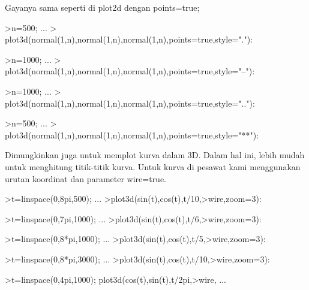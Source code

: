 \documentclass{article}
\begin{document}
\begin{eulernotebook}
\begin{eulercomment}
Gayanya sama seperti di plot2d dengan points=true;
\end{eulercomment}
\begin{eulerprompt}
>n=500;  ...
>  plot3d(normal(1,n),normal(1,n),normal(1,n),points=true,style="."):
\end{eulerprompt}
\begin{eulerprompt}
>n=1000;  ...
>  plot3d(normal(1,n),normal(1,n),normal(1,n),points=true,style="--"):
\end{eulerprompt}
\begin{eulerprompt}
>n=1000;  ...
>  plot3d(normal(1,n),normal(1,n),normal(1,n),points=true,style=".."):
\end{eulerprompt}
\begin{eulerprompt}
>n=500;  ...
>  plot3d(normal(1,n),normal(1,n),normal(1,n),points=true,style="**"):
\end{eulerprompt}
\begin{eulercomment}
Dimungkinkan juga untuk memplot kurva dalam 3D. Dalam hal ini, lebih
mudah untuk menghitung titik-titik kurva. Untuk kurva di pesawat kami
menggunakan urutan koordinat dan parameter wire=true.
\end{eulercomment}
\begin{eulerprompt}
>t=linspace(0,8pi,500); ...
>plot3d(sin(t),cos(t),t/10,>wire,zoom=3):
\end{eulerprompt}
\begin{eulerprompt}
>t=linspace(0,7pi,1000); ...
>plot3d(sin(t),cos(t),t/6,>wire,zoom=3):
\end{eulerprompt}
\begin{eulerprompt}
>t=linspace(0,8*pi,1000); ...
>plot3d(sin(t),cos(t),t/5,>wire,zoom=3):
\end{eulerprompt}
\begin{eulerprompt}
>t=linspace(0,8*pi,3000); ...
>plot3d(sin(t),cos(t),t/10,>wire,zoom=3):
\end{eulerprompt}
\begin{eulerprompt}
>t=linspace(0,4pi,1000); plot3d(cos(t),sin(t),t/2pi,>wire, ...

\end{eulerprompt}
\end{eulernotebook}
\end{document}
